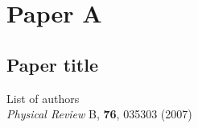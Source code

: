 \chapter*{Paper A}
\section*{Paper title}

\noindent List of authors\\

\noindent \textit{Physical Review} B, \textbf{76}, 035303 (2007)
\cleardoublepage


